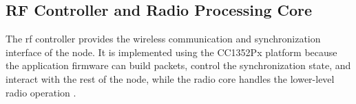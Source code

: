 



\subsection{RF Controller and Radio Processing Core}

The \acrshort{rf} controller provides the wireless communication and synchronization interface of the node. It is implemented using the CC1352Px platform because the application firmware can build packets, control the synchronization state, and interact with the rest of the node, while the radio core handles the lower-level radio operation \cite{ti_cc1352px_ds}.


